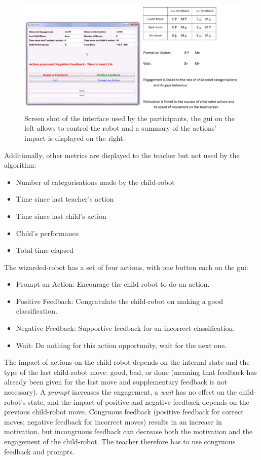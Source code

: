 \begin{figure}[ht]
	\centering
	\includegraphics[width=.9\textwidth]{GUI-woz.png}
	\caption{Screen shot of the interface used by the participants, the \gls{gui} on the left allows to control the robot and a summary of the actions' impact is displayed on the right.}
	\label{fig:woz_gui}
\end{figure}

Additionally, other metrics are displayed to the teacher but not used by the algorithm:
\begin{itemize}
	\item Number of categorisations made by the child-robot
	\item Time since last teacher's action
	\item Time since last child's action
	\item Child's performance
	\item Total time elapsed
\end{itemize}


The wizarded-robot has a set of four actions, with one button each on the \gls{gui}: 
\begin{itemize}
	\item Prompt an Action: Encourage the child-robot to do an action.
	\item Positive Feedback: Congratulate the child-robot on making a good classification.
	\item Negative Feedback: Supportive feedback for an incorrect classification.
	\item Wait: Do nothing for this action opportunity, wait for the next one.
\end{itemize}


The impact of actions on the child-robot depends on the internal state and the type of the last child-robot move: good, bad, or done (meaning that feedback has already been given for the last move and supplementary feedback is not necessary). A \textit{prompt} increases the engagement, a \textit{wait} has no effect on the child-robot's state, and the impact of positive and negative feedback depends on the previous child-robot move. Congruous feedback (positive feedback for correct moves; negative feedback for incorrect moves) results in an increase in motivation, but incongruous feedback can decrease both the motivation and the engagement of the child-robot. The teacher therefore has to use congruous feedback and prompts.

